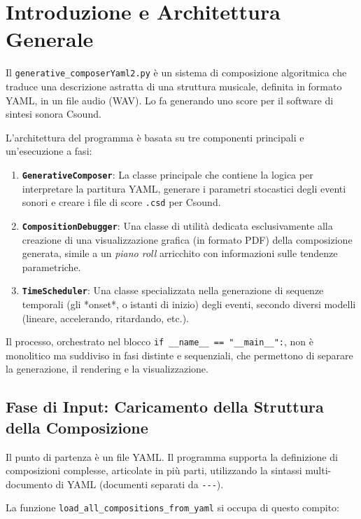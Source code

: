 
\section{Introduzione e Architettura Generale}
Il \texttt{generative\_composerYaml2.py} è un sistema di composizione algoritmica che traduce una descrizione astratta di una struttura musicale, definita in formato YAML, in un file audio (WAV). Lo fa generando uno score per il software di sintesi sonora Csound.

L'architettura del programma è basata su tre componenti principali e un'esecuzione a fasi:

\begin{enumerate}
    \item \textbf{\texttt{GenerativeComposer}}: La classe principale che contiene la logica per interpretare la partitura YAML, generare i parametri stocastici degli eventi sonori e creare i file di score \texttt{.csd} per Csound.
    \item \textbf{\texttt{CompositionDebugger}}: Una classe di utilità dedicata esclusivamente alla creazione di una visualizzazione grafica (in formato PDF) della composizione generata, simile a un \textit{piano roll} arricchito con informazioni sulle tendenze parametriche.
    \item \textbf{\texttt{TimeScheduler}}: Una classe specializzata nella generazione di sequenze temporali (gli *onset*, o istanti di inizio) degli eventi, secondo diversi modelli (lineare, accelerando, ritardando, etc.).
\end{enumerate}
Il processo, orchestrato nel blocco \texttt{if \_\_name\_\_ == "\_\_main\_\_":}, non è monolitico ma suddiviso in fasi distinte e sequenziali, che permettono di separare la generazione, il rendering e la visualizzazione.
\subsection{Fase di Input: Caricamento della Struttura della Composizione}
Il punto di partenza è un file YAML. Il programma supporta la definizione di composizioni complesse, articolate in più parti, utilizzando la sintassi multi-documento di YAML (documenti separati da \texttt{{-}{-}{-}}).

La funzione \texttt{load\_all\_compositions\_from\_yaml} si occupa di questo compito:


